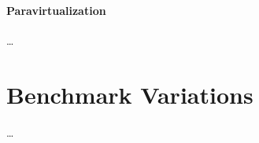 \paragraph{Paravirtualization}
\label{par:analysis_paravirtualization}
\ldots



\section{Benchmark Variations}
\label{sec:analysis_benchmarkvariations}
\ldots

